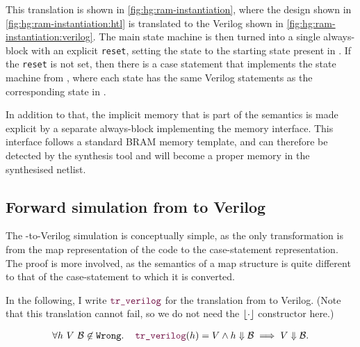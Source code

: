 This translation is shown in \cref{fig:hg:ram-instantiation}, where the \htl{}
design shown in \cref{fig:hg:ram-instantiation:htl} is translated to the Verilog
shown in \cref{fig:hg:ram-instantiation:verilog}.  The main state machine is
then turned into a single always-block with an explicit \texttt{reset}, setting
the state to the starting state present in \htl{}.  If the \texttt{reset} is not
set, then there is a case statement that implements the state machine from
\htl{}, where each state has the same Verilog statements as the corresponding
state in \htl{}.

In addition to that, the implicit memory that is part of the \htl{} semantics is
made explicit by a separate always-block implementing the memory interface.
This interface follows a standard \gls{BRAM} memory template, and can therefore
be detected by the synthesis tool and will become a proper memory in the
synthesised netlist.

\subsection{Forward simulation from \htl{} to Verilog}%
\label{sec:proof:htl_verilog}

The \htl{}-to-Verilog simulation is conceptually simple, as the only
transformation is from the map representation of the code to the case-statement
representation.  The proof is more involved, as the semantics of a map structure
is quite different to that of the case-statement to which it is converted.

\begin{lemma}\label{lemma:verilog}
  In the following, I write $\yhfunction{tr\_verilog}$ for the translation from
  \htl{} to Verilog. (Note that this translation cannot fail, so we do not need
  the $\lfloor \cdot \rfloor$ constructor here.)

  {\normalfont
    \begin{align*}
      \forall h\ V\ \mathcal{B} \not\in \texttt{Wrong}\ldotp\quad \yhfunction{tr\_verilog} (h) = V \land h \Downarrow \mathcal{B} \implies V \Downarrow \mathcal{B}.
    \end{align*}}
\end{lemma}

